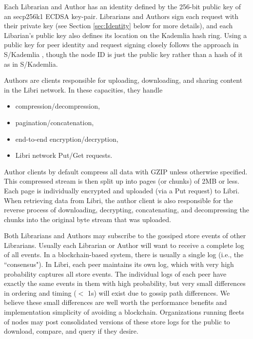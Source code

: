 \documentclass[10pt]{article}
\begin{document}
Each Librarian and Author has an identity defined by the 256-bit public key of an secp256k1 ECDSA key-pair. Librarians and Authors sign each request with their private key (see Section \ref{sec:Identity} below for more details), and each Libarian's public key also defines its location on the Kademlia hash ring. Using a public key for peer identity and request signing closely follows the approach in S/Kademlia \cite{skademlia}, though the node ID is just the public key rather than a hash of it as in S/Kademlia. 

Authors are clients responsible for uploading, downloading, and sharing content in the Libri network. In these capacities, they handle
\begin{itemize}
	\item compression/decompression,
	\item pagination/concatenation,
	\item end-to-end encryption/decryption,
	\item Libri network Put/Get requests.
\end{itemize}

Author clients by default compress all data with GZIP unless otherwise specified. This compressed stream is then split up into pages (or chunks) of 2MB or less. Each page is individually encrypted and uploaded (via a Put request) to Libri. When retrieving data from Libri, the author client is also responsible for the reverse process of downloading, decrypting, concatenating, and decompressing the chunks into the original byte stream that was uploaded.

Both Librarians and Authors may subscribe to the gossiped store events of other Librarians. Usually each Librarian or Author will want to receive a complete log of all events. In a blockchain-based system, there is usually a single log (i.e., the ``consensus"). In Libri, each peer maintains its own log, which with very high probability captures all store events. The individual logs of each peer have exactly the same events in them with high probability, but very small differences in ordering and timing ($<$ 1s) will exist due to gossip path differences. We believe these small differences are well worth the performance benefits and implementation simplicity of avoiding a blockchain. Organizations running fleets of nodes may post consolidated versions of these store logs for the public to download, compare, and query if they desire.
\end{document}
